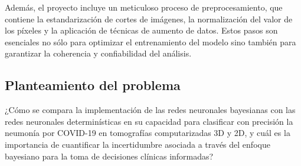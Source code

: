 \documentclass[10pt, oneside, a4paper]{article}
\begin{document}
	
	Además, el proyecto incluye un meticuloso proceso de preprocesamiento, que contiene la estandarización de cortes de imágenes, la normalización del valor de los píxeles y la aplicación de técnicas de aumento de datos. Estos pasos son esenciales no sólo para optimizar el entrenamiento del modelo sino también para garantizar la coherencia y confiabilidad del análisis.
	
	
	\subsection{Planteamiento del problema} \label{problema}
	

	
	
	¿Cómo se compara la implementación de las redes neuronales bayesianas con las redes neuronales determinísticas en su capacidad para clasificar con precisión la neumonía por COVID-19 en tomografías computarizadas 3D y 2D, y cuál es la importancia de cuantificar la incertidumbre asociada a través del enfoque bayesiano para la toma de decisiones clínicas informadas?
	
\end{document}
